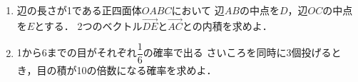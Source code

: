 \documentclass[../../main.tex]{subfiles}
\begin{document}
\begin{enumerate}
  \item 辺の長さが1である正四面体$OABC$において
    辺$AB$の中点を$D$，辺$OC$の中点を$E$とする．
    2つのベクトル$\overrightarrow{DE}$と$\overrightarrow{AC}$との内積を求めよ．
  \item 1から6までの目がそれぞれ$\displaystyle\dfrac{1}{6}$の確率で出る
    さいころを同時に3個投げるとき，目の積が10の倍数になる確率を求めよ．
\end{enumerate}
\end{document}
